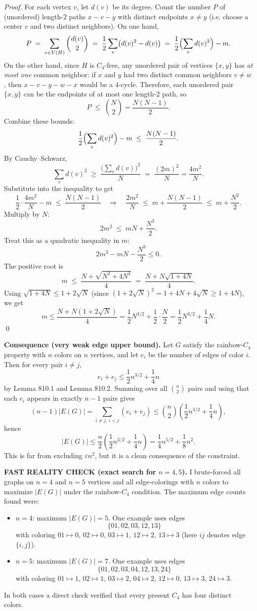 \emph{Proof.}
For each vertex $v$, let $d(v)$ be its degree. Count the number $P$ of (unordered) length-$2$ paths $x-v-y$ with distinct endpoints $x\ne y$ (i.e. choose a center $v$ and two distinct neighbors).
On one hand,
\[
P\;=\;\sum_{v\in V(H)} \binom{d(v)}{2}
\;=\;\frac12\sum_v \bigl(d(v)^2-d(v)\bigr)
\;=\;\frac12\Bigl(\sum_v d(v)^2\Bigr)-m.
\]
On the other hand, since $H$ is $C_4$-free, any unordered pair of vertices $\{x,y\}$ has \emph{at most one} common neighbor: if $x$ and $y$ had two distinct common neighbors $v\ne w$, then $x-v-y-w-x$ would be a 4-cycle. Therefore, each unordered pair $\{x,y\}$ can be the endpoints of at most one length-$2$ path, so
\[
P\;\le\;\binom{N}{2}=\frac{N(N-1)}{2}.
\]
Combine these bounds:
\[
\frac12\Bigl(\sum_v d(v)^2\Bigr)-m\;\le\;\frac{N(N-1)}{2}.
\]
By Cauchy--Schwarz,
\[
\sum_v d(v)^2\;\ge\;\frac{\bigl(\sum_v d(v)\bigr)^2}{N}
\;=\;\frac{(2m)^2}{N}=\frac{4m^2}{N}.
\]
Substitute into the inequality to get
\[
\frac12\cdot \frac{4m^2}{N}-m\;\le\;\frac{N(N-1)}{2}
\quad\Rightarrow\quad
\frac{2m^2}{N}\;\le\;m+\frac{N(N-1)}{2}\;\le\;m+\frac{N^2}{2}.
\]
Multiply by $N$:
\[
2m^2\;\le\;mN+\frac{N^3}{2}.
\]
Treat this as a quadratic inequality in $m$:
\[
2m^2-mN-\frac{N^3}{2}\le 0.
\]
The positive root is
\[
 m\;\le\;\frac{N+\sqrt{N^2+4N^3}}{4}
\;=\;\frac{N+N\sqrt{1+4N}}{4}.
\]
Using $\sqrt{1+4N}\le 1+2\sqrt{N}$ (since $(1+2\sqrt{N})^2=1+4N+4\sqrt{N}\ge 1+4N$), we get
\[
 m\le \frac{N+N(1+2\sqrt{N})}{4}=\frac12 N^{3/2}+\frac12\cdot \frac{N}{2}=\frac12 N^{3/2}+\frac14 N.
\]
\qed

\textbf{Consequence (very weak edge upper bound).}
Let $G$ satisfy the rainbow-$C_4$ property with $n$ colors on $n$ vertices, and let $e_i$ be the number of edges of color $i$. Then for every pair $i\ne j$,
\[
 e_i+e_j\le \frac12 n^{3/2}+\frac14 n
\]
by Lemma 810.1 and Lemma 810.2.
Summing over all $\binom{n}{2}$ pairs and using that each $e_i$ appears in exactly $n-1$ pairs gives
\[
(n-1)|E(G)|=\sum_{i\ne j,\,i<j} (e_i+e_j)\le \binom{n}{2}\left(\frac12 n^{3/2}+\frac14 n\right),
\]
hence
\[
|E(G)|\le \frac{n}{2}\left(\frac12 n^{3/2}+\frac14 n\right)=\frac14 n^{5/2}+\frac18 n^2.
\]
This is far from excluding $\varepsilon n^2$, but it is a clean consequence of the constraint.

\textbf{FAST REALITY CHECK (exact search for $n=4,5$).}
I brute-forced all graphs on $n=4$ and $n=5$ vertices and all edge-colorings with $n$ colors to maximize $|E(G)|$ under the rainbow-$C_4$ condition. The maximum edge counts found were:
\begin{itemize}
\item $n=4$: maximum $|E(G)|=5$. One example uses edges
\[
\{01,02,03,12,13\}
\]
with coloring $01\mapsto 0$, $02\mapsto 0$, $03\mapsto 1$, $12\mapsto 2$, $13\mapsto 3$ (here $ij$ denotes edge $\{i,j\}$).
\item $n=5$: maximum $|E(G)|=7$. One example uses edges
\[
\{01,02,03,04,12,13,24\}
\]
with coloring $01\mapsto 1$, $02\mapsto 1$, $03\mapsto 2$, $04\mapsto 2$, $12\mapsto 0$, $13\mapsto 3$, $24\mapsto 3$.
\end{itemize}
In both cases a direct check verified that every present $C_4$ has four distinct colors.

